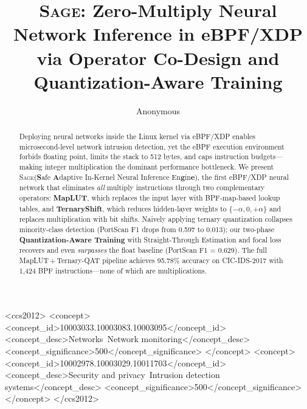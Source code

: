\documentclass[sigconf,nonacm]{acmart}
\newcommand{\sys}{\textsc{Sage}\xspace}
\begin{document}
\title{\sys: Zero-Multiply Neural Network Inference in eBPF/XDP \\via Operator Co-Design and Quantization-Aware Training}

\author{Anonymous}

\begin{abstract}
Deploying neural networks inside the Linux kernel via eBPF/XDP enables
microsecond-level network intrusion detection, yet the eBPF execution
environment forbids floating point, limits the stack to 512 bytes, and
caps instruction budgets---making integer multiplication the dominant
performance bottleneck.
We present \sys (\textbf{S}afe \textbf{A}daptive In-Kernel Neural
Inference En\textbf{g}in\textbf{e}), the first eBPF/XDP neural network
that eliminates \emph{all} multiply instructions through two
complementary operators: \textbf{MapLUT}, which replaces the input layer
with BPF-map-based lookup tables, and \textbf{TernaryShift}, which
reduces hidden-layer weights to $\{-\alpha, 0, +\alpha\}$ and replaces
multiplication with bit shifts.
Naively applying ternary quantization collapses minority-class detection
(PortScan F1 drops from 0.597 to 0.013); our two-phase
\textbf{Quantization-Aware Training} with Straight-Through Estimation
and focal loss recovers and even \emph{surpasses} the float baseline
(PortScan F1 = 0.629).
The full MapLUT\,+\,Ternary-QAT pipeline achieves 95.78\% accuracy on
CIC-IDS-2017 with 1{,}424 BPF instructions---none of which are
multiplications.
\end{abstract}

\begin{CCSXML}
<ccs2012>
<concept>
<concept_id>10003033.10003083.10003095</concept_id>
<concept_desc>Networks~Network monitoring</concept_desc>
<concept_significance>500</concept_significance>
</concept>
<concept>
<concept_id>10002978.10003029.10011703</concept_id>
<concept_desc>Security and privacy~Intrusion detection systems</concept_desc>
<concept_significance>500</concept_significance>
</concept>
</ccs2012>
\end{CCSXML}


\end{document}
